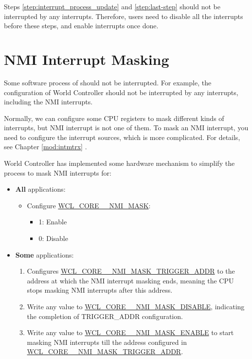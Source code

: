 \documentclass[main\_\_EN.tex]{subfiles}
\begin{document}
\begin{tiplisting}
Steps \ref{step:interrupt_process_update} and \ref{step:last-step} should not be interrupted by any interrupts. Therefore, users need to disable all the interrupts before these steps, and enable interrupts once done.
\end{tiplisting}

\section{NMI Interrupt Masking}

Some software process of \chipname{} should not be interrupted. For example, the configuration of World Controller should not be interrupted by any interrupts, including the NMI interrupts.

Normally, we can configure some CPU registers to mask different kinds of interrupts, but NMI interrupt is not one of them. To mask an NMI interrupt, you need to configure the interrupt sources, which is more complicated. For details, see Chapter \ref{mod:intmtrx} \textit{}.

World Controller has implemented some hardware mechanism to simplify the process to mask NMI interrupts for:
\begin{itemize}
    \item \textbf{All} applications:
    \begin{itemize}
        \item Configure \hyperref[fielddesc:WCLCORE0NMIMASK]{WCL\_CORE\_\_NMI\_MASK}:
            \begin{itemize}
            \item 1: Enable
            \item 0: Disable
            \end{itemize}
    \end{itemize}
    \item \textbf{Some} applications:
        \begin{enumerate}
            \item Configures \hyperref[fielddesc:WCLCORE0NMIMASKTRIGGERADDR]{WCL\_CORE\_\_NMI\_MASK\_TRIGGER\_ADDR} to the address at which the NMI interrupt masking ends, meaning the CPU stops masking NMI interrupts after this address.
            \item Write any value to \hyperref[fielddesc:WCLCORE0NMIMASKDISABLE]{WCL\_CORE\_\_NMI\_MASK\_DISABLE}, indicating the completion of TRIGGER\_ADDR configuration.            \item Write any value to  \hyperref[fielddesc:WCLCORE0NMIMASKENABLE]{WCL\_CORE\_\_NMI\_MASK\_ENABLE} to start masking NMI interrupts till the address configured in \hyperref[fielddesc:WCLCORE0NMIMASKTRIGGERADDR]{WCL\_CORE\_\_NMI\_MASK\_TRIGGER\_ADDR}.
        \end{enumerate}
\end{itemize}
\end{document}
